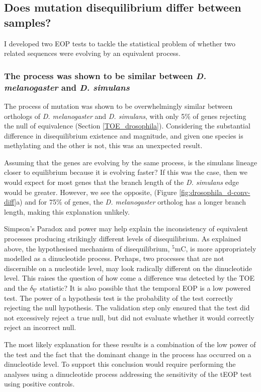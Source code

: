 \subsection{Does mutation disequilibrium differ between samples?}

I developed two EOP tests to tackle the statistical problem of whether two related sequences were evolving by an equivalent process. 

\subsubsection{The process was shown to be similar between \textit{D. melanogaster} and \textit{D. simulans} }

The process of mutation was shown to be overwhelmingly similar between orthologs of \textit{D. melanogaster} and \textit{D. simulans}, with only 5\% of genes rejecting the null of equivalence (Section \ref{TOE_drosophila}). Considering the substantial difference in disequilibrium existence and magnitude, and given one species is methylating and the other is not, this was an unexpected result. 

Assuming that the genes are evolving by the same process, is the simulans lineage closer to equilibrium because it is evolving faster? If this was the case, then we would expect for most genes that the branch length of the \textit{D. simulans} edge would be greater. However, we see the opposite, (Figure \ref{fig:drosophila_d-conv-diff}a) and for 75\% of genes, the \textit{D. melanogaster} ortholog has a longer branch length, making this explanation unlikely. 

Simpson's Paradox and power may help explain the inconsistency of equivalent processes producing strikingly different levels of disequilibrium. As explained above, the hypothesised mechanism of disequilibrium, $^5$mC, is more appropriately modelled as a dinucleotide process. Perhaps, two processes that are not discernible on a nucleotide level, may look radically different on the dinucleotide level. This raises the question of how come a difference was detected by the TOE and the $\delta_\nabla$ statistic? It is also possible that the temporal EOP is a low powered test. The power of a hypothesis test is the probability of the test correctly rejecting the null hypothesis. The validation step only ensured that the test did not excessively reject a true null, but did not evaluate whether it would correctly reject an incorrect null.

The most likely explanation for these results is a combination of the low power of the test and the fact that the dominant change in the process has occurred on a dinucleotide level. To support this conclusion would require performing the analyses using a dinucleotide process addressing the sensitivity of the tEOP test using positive controls. 


